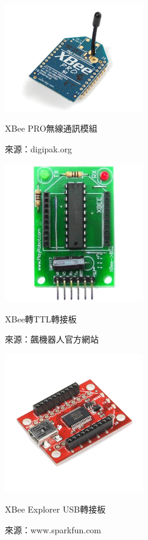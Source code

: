 \begin{figure}[h!]
	\centering
	\includegraphics[width=6cm]{figures/xbee_pro}
	\caption{XBee PRO無線通訊模組}
	\caption{來源：digipak.org}
	\label{f:xbee_pro}
\end{figure}

\begin{figure}[h!]
	\centering
	\includegraphics[width=6cm]{figures/xbee2ttl}
	\caption{XBee轉TTL轉接板}
	\caption*{來源：飆機器人官方網站}
	\label{f:xbee2ttl}
\end{figure}

\begin{figure}[h!]
	\centering
	\includegraphics[width=6cm]{figures/xbee2usb}
	\caption{XBee Explorer USB轉接板}
	\caption*{來源：www.sparkfun.com}
	\label{f:xbee2usb}
\end{figure}

